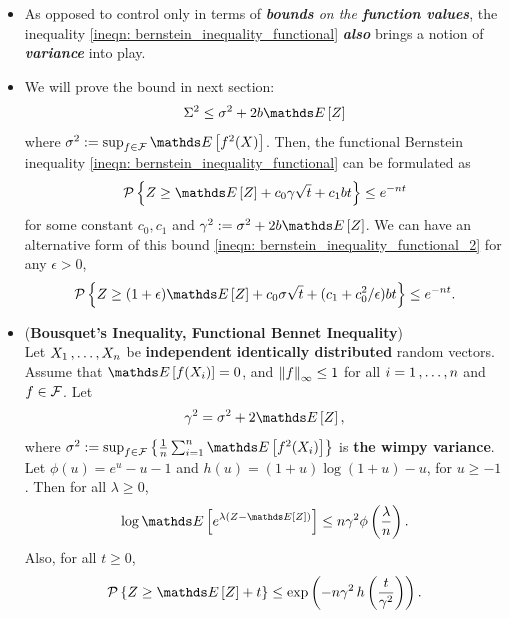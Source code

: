 \documentclass[11pt]{article}
\begin{document}
\begin{itemize}
\item \begin{remark}
As opposed to control only in terms of \emph{\textbf{bounds} on the \textbf{function values}}, the inequality \eqref{ineqn: bernstein_inequality_functional} \textbf{\emph{also}} brings a notion of \emph{\textbf{variance}} into play. 
\end{remark}

\item \begin{remark}
We will prove the bound in next section:
\begin{align*}
\Sigma^2 \le \sigma^2 + 2b\E{}{Z}
\end{align*} where $\sigma^2 := \sup_{f\in \cF}\E{}{f^2(X)}$. Then, the functional Bernstein inequality \eqref{ineqn: bernstein_inequality_functional} can be formulated as
\begin{align}
\cP\set{Z \ge \E{}{Z} +c_0 \gamma \sqrt{t} + c_1 bt} \le  e^{- n t}  \label{ineqn: bernstein_inequality_functional_2}
\end{align} for some constant $c_0, c_1$ and $\gamma^2 := \sigma^2 + 2b\E{}{Z}$. We can have an alternative form of this bound \eqref{ineqn: bernstein_inequality_functional_2} for any $\epsilon > 0$, 
\begin{align}
\cP\set{Z \ge (1+\epsilon)\E{}{Z} +c_0 \sigma \sqrt{t} + (c_1 + c_0^2/\epsilon)bt} \le  e^{- n t}.  \label{ineqn: bernstein_inequality_functional_3}
\end{align}
\end{remark}

\item \begin{theorem} (\textbf{Bousquet's Inequality, Functional Bennet Inequality})  \citep{boucheron2013concentration}\\
Let $X_1 \,{,}\ldots{,}\, X_n$ be \textbf{independent} \textbf{identically distributed} random vectors. Assume that $\E{}{f(X_i)} = 0$, and $\left\|f\right\|_{\infty} \le 1$ for all $i = 1 \,{,}\ldots{,}\, n$ and $f \in {\mathcal F}$.
Let
\begin{align*}
\gamma^2= \sigma^2 + 2\E{}{Z},
\end{align*} where $\sigma^2 := \sup_{f\in \cF}\set{\frac{1}{n}\sum_{i=1}^n\E{}{f^2(X_i)}}$ is \textbf{the wimpy variance}. Let $\phi(u) = e^u - u - 1$ and $h(u) = (1 + u) \log(1 + u) - u$, for $u \ge -1$. Then for all $\lambda \ge 0$,
\begin{align*}
\log \E{}{e^{\lambda\paren{Z - \E{}{Z}}}} \le n\gamma^2 \phi\paren{\frac{\lambda}{n}}.
\end{align*}
Also, for all $t \ge 0$,
\begin{align}
\cP\set{Z \ge \E{}{Z} + t} \le \exp\paren{- n\gamma^2 \, h\paren{\frac{t}{\gamma^2}}}. \label{ineqn: bousquet_inequality_bennet_functional}
\end{align}
\end{theorem}
\end{itemize}
\end{document}
